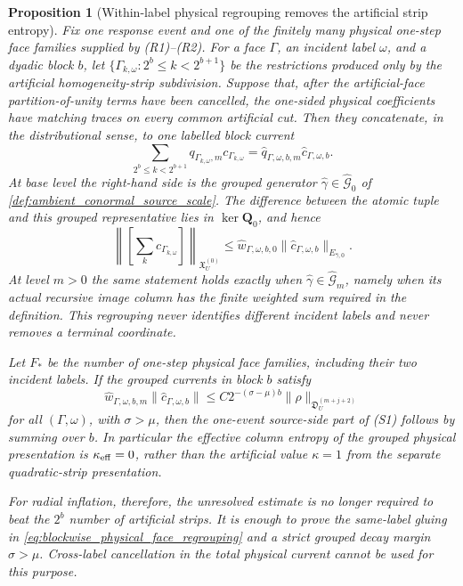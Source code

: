 \documentclass[11pt]{amsart}
\theoremstyle{compactplain}
\newtheorem{proposition}[theorem]{Proposition}
\theoremstyle{compactdefinition}
\theoremstyle{compactremark}
\begin{document}
\begin{proposition}[Within-label physical regrouping removes the artificial strip entropy]
\label{prop:physical_face_regrouping_removes_strip_entropy}
Fix one response event and one of the finitely many physical one-step face
families supplied by (R1)--(R2).  For a face \(\Gamma\), an incident label
\(\omega\), and a dyadic block \(b\), let
\(\{\Gamma_{k,\omega}:2^b\le k<2^{b+1}\}\) be the restrictions produced only
by the artificial homogeneity-strip subdivision.  Suppose that, after the
artificial-face partition-of-unity terms have been cancelled, the one-sided
physical coefficients have matching traces on every common artificial cut.
Then they concatenate, in the distributional sense, to one labelled block
current
\begin{equation}
\label{eq:blockwise_physical_face_regrouping}
 \sum_{2^b\le k<2^{b+1}}
 q_{\Gamma_{k,\omega},m}c_{\Gamma_{k,\omega}}
 =
 \widehat q_{\Gamma,\omega,b,m}
 \widehat c_{\Gamma,\omega,b}.
\end{equation}
At base level the right-hand side is the grouped generator
\(\widehat\gamma\in\widehat{\mathscr G}_0\) of
\cref{def:ambient_conormal_source_scale}.  The difference between the atomic
tuple and this grouped representative lies in \(\ker\mathbf Q_0\), and hence
\begin{equation}
\label{eq:grouped_quotient_norm_bound}
 \left\|\left[\sum_k c_{\Gamma_{k,\omega}}\right]\right\|_{
   \mathfrak X_U^{(0)}}
 \le
 \widehat w_{\Gamma,\omega,b,0}
 \|\widehat c_{\Gamma,\omega,b}\|_{E_{\widehat\gamma,0}}.
\end{equation}
At level \(m>0\) the same statement holds exactly when
\(\widehat\gamma\in\widehat{\mathscr G}_m\), namely when its actual recursive
image column has the finite weighted sum required in the definition.  This
regrouping never identifies different incident labels and never removes a
terminal coordinate.

Let \(F_*\) be the number of one-step physical face families, including their
two incident labels.  If the grouped currents in block \(b\) satisfy
\begin{equation}
\label{eq:grouped_radial_s1_target}
 \widehat w_{\Gamma,\omega,b,m}
 \|\widehat c_{\Gamma,\omega,b}\|
 \le C2^{-(\sigma-\mu)b}
 \|\rho\|_{\mathfrak D_U^{(m+j+2)}}
\end{equation}
for all \((\Gamma,\omega)\), with \(\sigma>\mu\), then the one-event
source-side part of (S1) follows by summing over \(b\).  In particular the
effective column entropy of the grouped physical presentation is
\(\kappa_{\rm eff}=0\), rather than the artificial value \(\kappa=1\) from
the separate quadratic-strip presentation.

For radial inflation, therefore, the unresolved estimate is no longer required
to beat the \(2^b\) number of artificial strips.  It is enough to prove the
same-label gluing in \eqref{eq:blockwise_physical_face_regrouping} and a
strict grouped decay margin \(\sigma>\mu\).  Cross-label cancellation in the
total physical current cannot be used for this purpose.
\end{proposition}
\end{document}
